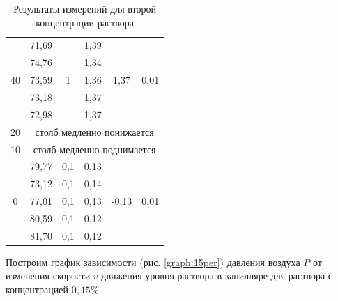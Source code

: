 \documentclass[a4paper, 12pt]{article}
\begin{document}
\begin{table}[H]
\begin{tabular}{|c|ccccc|}
            \multirow{5}{*}{40} & \multicolumn{1}{c|}{71,69} & \multicolumn{1}{c|}{\multirow{5}{*}{1}} & \multicolumn{1}{c|}{1,39} & \multicolumn{1}{c|}{\multirow{5}{*}{1,37}} & \multirow{5}{*}{0,01} \\ \cline{2-2} \cline{4-4}
             & \multicolumn{1}{c|}{74,76} & \multicolumn{1}{c|}{} & \multicolumn{1}{c|}{1,34} & \multicolumn{1}{c|}{} &  \\ \cline{2-2} \cline{4-4}
             & \multicolumn{1}{c|}{73,59} & \multicolumn{1}{c|}{} & \multicolumn{1}{c|}{1,36} & \multicolumn{1}{c|}{} &  \\ \cline{2-2} \cline{4-4}
             & \multicolumn{1}{c|}{73,18} & \multicolumn{1}{c|}{} & \multicolumn{1}{c|}{1,37} & \multicolumn{1}{c|}{} &  \\ \cline{2-2} \cline{4-4}
             & \multicolumn{1}{c|}{72,98} & \multicolumn{1}{c|}{} & \multicolumn{1}{c|}{1,37} & \multicolumn{1}{c|}{} &  \\ \hline
            20 & \multicolumn{5}{c|}{столб медленно понижается} \\ \hline
            10 & \multicolumn{5}{c|}{столб медленно поднимается} \\ \hline
            \multirow{5}{*}{0} & \multicolumn{1}{c|}{79,77} & \multicolumn{1}{c|}{0,1} & \multicolumn{1}{c|}{0,13} & \multicolumn{1}{c|}{\multirow{5}{*}{-0,13}} & \multirow{5}{*}{0,01} \\ \cline{2-4}
             & \multicolumn{1}{c|}{73,12} & \multicolumn{1}{c|}{0,1} & \multicolumn{1}{c|}{0,14} & \multicolumn{1}{c|}{} &  \\ \cline{2-4}
             & \multicolumn{1}{c|}{77,01} & \multicolumn{1}{c|}{0,1} & \multicolumn{1}{c|}{0,13} & \multicolumn{1}{c|}{} &  \\ \cline{2-4}
             & \multicolumn{1}{c|}{80,59} & \multicolumn{1}{c|}{0,1} & \multicolumn{1}{c|}{0,12} & \multicolumn{1}{c|}{} &  \\ \cline{2-4}
             & \multicolumn{1}{c|}{81,70} & \multicolumn{1}{c|}{0,1} & \multicolumn{1}{c|}{0,12} & \multicolumn{1}{c|}{} &  \\ \hline
            \end{tabular}
            \caption{Результаты измерений для второй концентрации раствора}
            \label{table:1.5per}
        \end{table}

        \noindent Построим график зависимости (рис. \ref{graph:15per}) давления воздуха $P$ от изменения скорости $v$ движения уровня раствора в капилляре для раствора с концентрацией $0,15 \%$. \\
\end{document}
